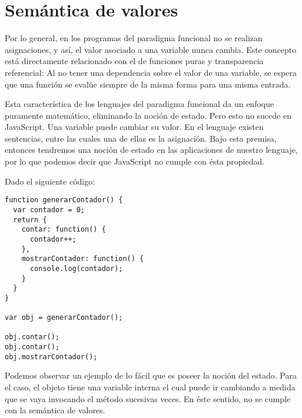 \section{Semántica de valores}

Por lo general, en los programas del paradigma funcional no se realizan asignaciones, y así, el valor asociado a una variable nunca cambia. Este concepto está directamente relacionado con el de funciones puras y transparencia referencial: Al no tener una dependencia sobre el valor de una variable, se espera que una función se evalúe siempre de la misma forma para una misma entrada.

Esta característica de los lenguajes del paradigma funcional da un enfoque puramente matemático, eliminando la noción de estado. Pero esto no sucede en JavaScript. Una variable puede cambiar su valor. En el lenguaje existen sentencias, entre las cuales una de ellas es la asignación. Bajo esta premisa, entonces tendremos una noción de estado en las aplicaciones de nuestro lenguaje, por lo que podemos decir que JavaScript no cumple con ésta propiedad.

Dado el siguiente código:

\begin{lstlisting}[title={Noción de estado}]
function generarContador() {
  var contador = 0;
  return {
    contar: function() {
      contador++;
    },
    mostrarContador: function() {
      console.log(contador);
    }
  }
}

var obj = generarContador();

obj.contar();
obj.contar();
obj.mostrarContador();
\end{lstlisting}

Podemos observar un ejemplo de lo fácil que es poseer la noción del estado. Para el caso, el objeto tiene una variable interna  el cual puede ir cambiando a medida que se vaya invocando el método  sucesivas veces. En éste sentido, no se cumple con la semántica de valores.

